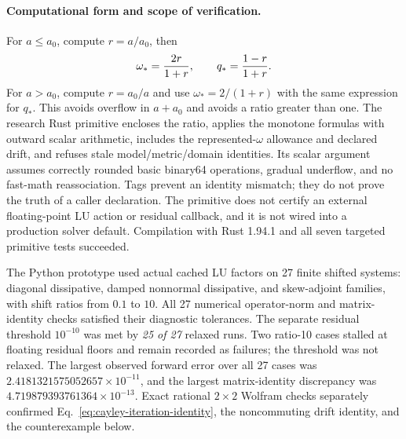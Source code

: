 \paragraph{Computational form and scope of verification.}
For $a\leq a_0$, compute $r=a/a_0$, then
\begin{equation}
 \omega_*={2r\over1+r},\qquad q_*={1-r\over1+r}.
\end{equation}
For $a>a_0$, compute $r=a_0/a$ and use $\omega_*=2/(1+r)$ with the same
expression for $q_*$.  This avoids overflow in $a+a_0$ and avoids a ratio
greater than one.  The research Rust primitive encloses the ratio, applies
the monotone formulas with outward scalar arithmetic, includes the
represented-$\omega$ allowance and declared drift, and refuses stale
model/metric/domain identities.  Its scalar argument assumes correctly
rounded basic binary64 operations, gradual underflow, and no
fast-math reassociation.  Tags prevent an identity mismatch; they do not
prove the truth of a caller declaration.  The primitive does not certify an
external floating-point LU action or residual callback, and it is not wired
into a production solver default.  Compilation with Rust 1.94.1 and all
seven targeted primitive tests succeeded.

The Python prototype used actual cached LU factors on 27 finite shifted
systems: diagonal dissipative, damped nonnormal dissipative, and skew-adjoint
families, with shift ratios from $0.1$ to $10$.  All 27 numerical
operator-norm and matrix-identity checks satisfied their diagnostic
tolerances.  The separate residual threshold $10^{-10}$ was met by
\emph{25 of 27} relaxed runs.  Two ratio-10 cases stalled at floating
residual floors and remain recorded as failures; the threshold was not
relaxed.  The largest observed forward error over all 27 cases was
$2.4181321575052657\times10^{-11}$, and the largest matrix-identity discrepancy
was $4.719879393761364\times10^{-13}$.  Exact rational $2\times2$ Wolfram
checks separately confirmed Eq.~\eqref{eq:cayley-iteration-identity}, the
noncommuting drift identity, and the counterexample below.

